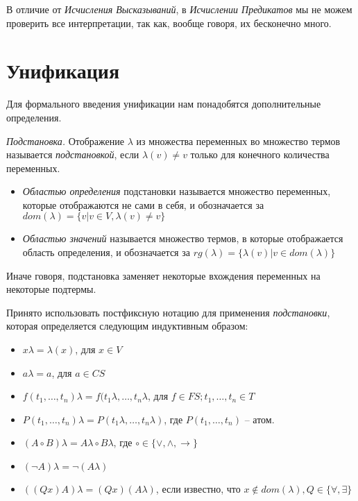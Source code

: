 В отличие от \textit{Исчисления Высказываний}, в \textit{Исчислении Предикатов} мы не можем проверить все интерпретации, так как, вообще говоря, их бесконечно много.\\

\section{Унификация}
Для формального введения унификации нам понадобятся дополнительные определения.

\begin{definition}
  \emph{Подстановка.} Отображение $\lambda$ из множества переменных во множество термов называется \emph{подстановкой}, если $\lambda(v) \neq v$ только для конечного количества переменных.
\begin{itemize}  
  \item \emph{Областью определения} подстановки называется множество переменных, которые отображаются не сами в себя, и обозначается за $dom(\lambda) = \{v | v \in V, \lambda(v) \neq v\}$ 
  \item \emph{Областью значений} называется множество термов, в которые отображается область определения, и обозначается за $rg(\lambda) = \{\lambda(v) | v \in dom(\lambda)\}$
\end{itemize}
\end{definition}

Иначе говоря, подстановка заменяет некоторые вхождения переменных на некоторые подтермы.

Принято использовать постфиксную нотацию для применения \emph{подстановки}, которая определяется следующим индуктивным образом: 
\begin{itemize}
	\item $x\lambda = \lambda(x)$, для $x \in V$
    \item $a\lambda = a$, для $a \in CS$
    \item $f(t_1, \ldots, t_n)\lambda = f(t_1\lambda, \ldots, t_n\lambda$, для $f \in FS; t_1,\ldots,t_n \in T$
    \item $P(t_1, \ldots, t_n)\lambda = P(t_1\lambda, \ldots, t_n\lambda)$, где $P(t_1, \ldots, t_n)$ -- атом.
    \item $(A \circ B)\lambda = A\lambda \circ B\lambda$, где $\circ \in \{\vee, \wedge, \rightarrow\}$
    \item $(\neg A)\lambda = \neg(A\lambda)$
    \item $((Qx)A)\lambda = (Qx)(A\lambda)$, если известно, что $x \notin dom(\lambda), Q \in \{\forall, \exists\}$
\end{itemize}

